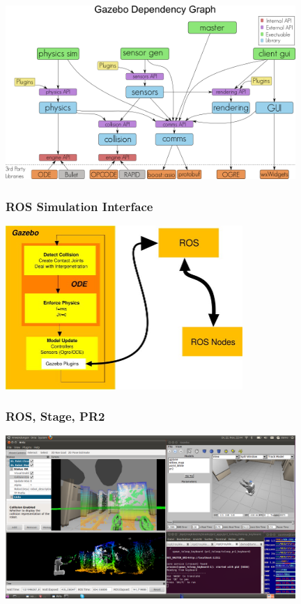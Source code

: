 \begin{frame}
\includegraphics[width=11cm]{images/gazebo_dependency_graph.png}
\end{frame}

\begin{frame}
  \frametitle{ROS Simulation Interface}
\hspace{5ex}\includegraphics[width=9cm]{images/ros_simulation_interface.jpg}
\end{frame}

\begin{frame}
  \frametitle{ROS, Stage, PR2}
\includegraphics[width=11cm]{images/race_pr2_ros_rviz2.png}
\end{frame}
